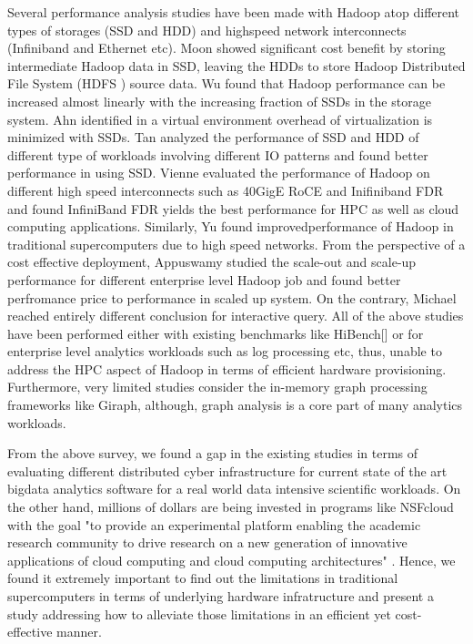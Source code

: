 \documentclass[conference]{IEEEtran}
\begin{document}
Several performance analysis studies have been made with Hadoop atop different types of storages (SSD and HDD) and highspeed network interconnects (Infiniband and Ethernet etc).
Moon \cite{ssdhdd:moon} showed significant cost benefit by storing intermediate Hadoop data in SSD, leaving the HDDs to store Hadoop Distributed File System (HDFS \cite{fw:hdfs}) source data.
Wu \cite{ssdhdd:wu} found that Hadoop performance can be increased almost linearly with the increasing fraction of SSDs in the storage system.
Ahn \cite{ssdhdd:ahn} identified in a virtual environment overhead of virtualization is minimized with SSDs.
Tan \cite{ssdhdd:tan} analyzed the performance of SSD and HDD of different type of workloads involving different IO patterns and found better performance in using SSD.
Vienne \cite{ethib:vienne} evaluated the performance of Hadoop on different high speed interconnects such as 40GigE RoCE and Inifiniband FDR and found InfiniBand FDR yields the best performance for HPC as well as cloud computing applications.
Similarly, Yu \cite{ethib:yu} found improvedperformance of Hadoop in traditional supercomputers due to high speed networks.
From the perspective of a cost effective deployment, Appuswamy \cite{scaleupscaleout:appuswamy} studied the scale-out and scale-up performance for different enterprise level Hadoop job and found better perfromance price to performance in scaled up system.
On the contrary, Michael \cite{scaleupscaleout:michael} reached entirely different conclusion for interactive query.
All of the above studies have been performed either with existing benchmarks like HiBench[] or for enterprise level analytics workloads such as log processing etc, thus, unable to address the HPC aspect of Hadoop in terms of efficient hardware provisioning.
Furthermore, very limited studies consider the in-memory graph processing frameworks like Giraph, although, graph analysis is a core part of many analytics workloads.     

From the above survey, we found a gap in the existing studies in terms of evaluating different distributed cyber infrastructure for current state of the art bigdata analytics software for a real world data intensive scientific workloads.
On the other hand, millions of dollars are being invested in programs like NSFcloud with the goal "to provide an experimental platform enabling the academic research community to drive research on a new generation of innovative applications of cloud computing and cloud computing architectures" \cite{nsfcloud} . 
Hence, we found it extremely important to find out the limitations in traditional supercomputers in terms of underlying hardware infratructure and present a study addressing how to alleviate those limitations in an efficient yet cost-effective manner.
\end{document}
